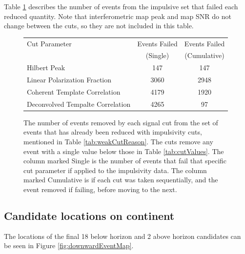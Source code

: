 	
		
		Table \ref{tab:signalCutReason} describes the number of events from the impulsive set that failed each reduced quantity.  Note that interferometric map peak and map SNR do not change between the cuts, so they are not included in this table.
		
		\begin{figure}
		\centering
		\begin{tabular}[c]{|l|c|c|}
		\hline
		Cut Parameter & Events Failed & Events Failed \\
		 & (Single) &  (Cumulative) \\
		\hline
		Hilbert Peak & 147 & 147\\
		Linear Polarization Fraction & 3060 & 2948\\
		Coherent Template Correlation & 4179 & 1920\\
		Deconvolved Tempalte Correlation & 4265 & 97\\
		\hline
		\end{tabular}
		\caption{The number of events removed by each signal cut from the set of events that has already been reduced with impulsivity cuts, mentioned in Table \ref{tab:weakCutReason}.  The cuts remove any event with a single value below those in Table \ref{tab:cutValues}.  The column marked Single is the number of events that fail that specific cut parameter if applied to the impulsivity data.  The column marked Cumulative is if each cut was taken sequentially, and the event removed if failing, before moving to the next.}
		\label{tab:signalCutReason}
		\end{figure}
		
		
	\subsection{Candidate locations on continent}
		The locations of the final 18 below horizon and 2 above horizon candidates can be seen in Figure \ref{fig:downwardEventMap}.
		
